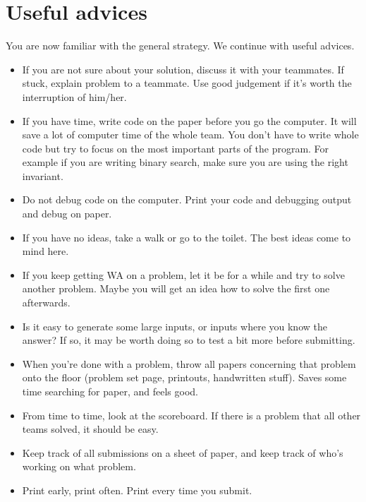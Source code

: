 \documentclass{article}
\begin{document}
\section{Useful advices}
You are now familiar with the general strategy. We continue with useful advices.
\begin{itemize}
  \item If you are not sure about your solution, discuss it with your teammates.
  If stuck, explain problem to a teammate. Use good judgement if it's worth the
  interruption of him/her.

  \item If you have time, write code on the paper before you go the computer. It
  will save a lot of computer time of the whole team. You don't have to write
  whole code but try to focus on the most important parts of the program. For
  example if you are writing binary search, make sure you are using the right
  invariant.

  \item Do not debug code on the computer. Print your code and debugging output
  and debug on paper.

  \item If you have no ideas, take a walk or go to the toilet. The best ideas
  come to mind here.

  \item If you keep getting WA on a problem, let it be for a while and try to
  solve another problem. Maybe you will get an idea how to solve the first one
  afterwards.

  \item Is it easy to generate some large inputs, or inputs where you know the
  answer? If so, it may be worth doing so to test a bit more before submitting.

  \item When you're done with a problem, throw all papers concerning that
  problem onto the floor (problem set page, printouts, handwritten stuff). Saves
  some time searching for paper, and feels good.

  \item From time to time, look at the scoreboard. If there is a problem that
  all other teams solved, it should be easy.

  \item Keep track of all submissions on a sheet of paper, and keep track of
  who's working on what problem.

  \item Print early, print often. Print every time you submit.


\end{itemize}
\end{document}
